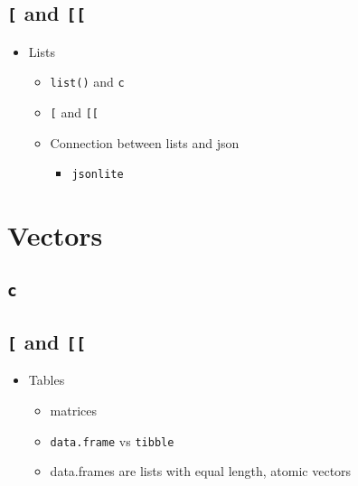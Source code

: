 \documentclass[
]{book}
\providecommand{\tightlist}{%
  \setlength{\itemsep}{0pt}\setlength{\parskip}{0pt}}
\begin{document}
\hypertarget{and-1}{%
\section{\texorpdfstring{\texttt{{[}} and \texttt{{[}{[}}}{{[} and {[}{[}}}\label{and-1}}

\begin{itemize}
\tightlist
\item
  Lists

  \begin{itemize}
  \tightlist
  \item
    \texttt{list()} and \texttt{c}
  \item
    \texttt{{[}} and \texttt{{[}{[}}
  \item
    Connection between lists and json

    \begin{itemize}
    \tightlist
    \item
      \texttt{jsonlite}
    \end{itemize}
  \end{itemize}
\end{itemize}

\hypertarget{vectors-2}{%
\chapter{Vectors}\label{vectors-2}}

\hypertarget{c-1}{%
\section{\texorpdfstring{\texttt{c}}{c}}\label{c-1}}

\hypertarget{and-2}{%
\section{\texorpdfstring{\texttt{{[}} and \texttt{{[}{[}}}{{[} and {[}{[}}}\label{and-2}}

\begin{itemize}
\tightlist
\item
  Tables

  \begin{itemize}
  \tightlist
  \item
    matrices
  \item
    \texttt{data.frame} vs \texttt{tibble}
  \item
    data.frames are lists with equal length, atomic vectors
  \end{itemize}
\end{itemize}
\end{document}
